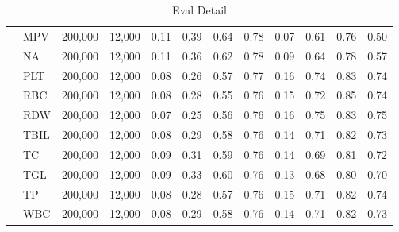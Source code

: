 \begin{table}[ht]
\begin{tabular}{llrrrrrrrrrr}
 & MPV & 200,000 & 12,000 & 0.11 & 0.39 & 0.64 & 0.78 & 0.07 & 0.61 & 0.76 & 0.50 \\
 & NA & 200,000 & 12,000 & 0.11 & 0.36 & 0.62 & 0.78 & 0.09 & 0.64 & 0.78 & 0.57 \\
 & PLT & 200,000 & 12,000 & 0.08 & 0.26 & 0.57 & 0.77 & 0.16 & 0.74 & 0.83 & 0.74 \\
 & RBC & 200,000 & 12,000 & 0.08 & 0.28 & 0.55 & 0.76 & 0.15 & 0.72 & 0.85 & 0.74 \\
 & RDW & 200,000 & 12,000 & 0.07 & 0.25 & 0.56 & 0.76 & 0.16 & 0.75 & 0.83 & 0.75 \\
 & TBIL & 200,000 & 12,000 & 0.08 & 0.29 & 0.58 & 0.76 & 0.14 & 0.71 & 0.82 & 0.73 \\
 & TC & 200,000 & 12,000 & 0.09 & 0.31 & 0.59 & 0.76 & 0.14 & 0.69 & 0.81 & 0.72 \\
 & TGL & 200,000 & 12,000 & 0.09 & 0.33 & 0.60 & 0.76 & 0.13 & 0.68 & 0.80 & 0.70 \\
 & TP & 200,000 & 12,000 & 0.08 & 0.28 & 0.57 & 0.76 & 0.15 & 0.71 & 0.82 & 0.74 \\
 & WBC & 200,000 & 12,000 & 0.08 & 0.29 & 0.58 & 0.76 & 0.14 & 0.71 & 0.82 & 0.73 \\
\bottomrule
\end{tabular}
\caption{Eval Detail}
\label{tab:eval_detail}
\end{table}